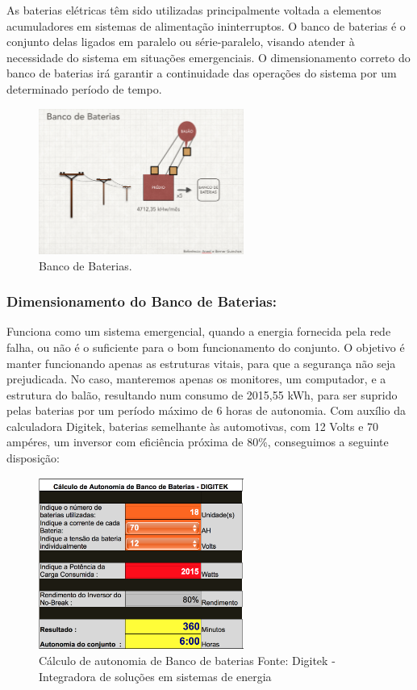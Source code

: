 As baterias elétricas têm sido utilizadas principalmente voltada a elementos acumuladores em sistemas de alimenta\c{c}ão ininterruptos. O banco de baterias é o conjunto delas ligados em paralelo ou série-paralelo, visando atender à necessidade do sistema em situações emergenciais. O dimensionamento correto do banco de baterias irá garantir a continuidade das operações do sistema por um determinado período de tempo.

\begin{figure}[H]
	\centering
	\includegraphics[width=0.6\textwidth]{figuras/baterias}
	\caption{Banco de Baterias.}
	\label{img:baterias}
\end{figure}

\subsubsection{Dimensionamento do Banco de Baterias:}

Funciona como um sistema emergencial, quando a energia fornecida pela rede falha, ou não é o suficiente para o bom funcionamento do conjunto. O objetivo é manter funcionando apenas as estruturas vitais, para que a segurança não seja prejudicada. No caso, manteremos apenas os monitores, um computador, e a estrutura do balão, resultando num consumo de 2015,55 kWh, para ser suprido pelas baterias por um período máximo de 6 horas de autonomia.
Com auxílio da calculadora Digitek, baterias semelhante às automotivas, com 12 Volts e 70 ampéres, um inversor com eficiência próxima de 80\%, conseguimos a seguinte disposição:

\begin{figure}[H]
	\centering
	\includegraphics[width=0.6\textwidth]{figuras/calculo}
	\caption{Cálculo de autonomia de Banco de baterias Fonte: Digitek - Integradora de soluções em sistemas de energia}
	\label{img:calculo}
\end{figure}


